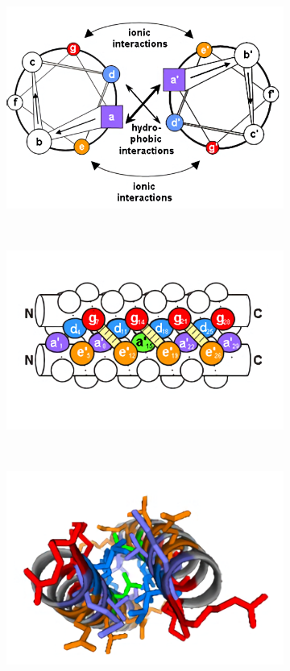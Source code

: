 \documentclass[12pt,a4paper,titlepage,openany]{report}
\begin{document}
\begin{figure}[h]
	\centering
	\begin{subfigure}{0.48\linewidth}
		\includegraphics[width=\linewidth]{coiled_coil_structure_a}
		\caption{}
		\label{subfig:Structure of coiled coils a}
	\end{subfigure}
	~
	\begin{subfigure}{0.48\linewidth}
		\includegraphics[width=\linewidth]{coiled_coil_structure_b}
		\caption{}
		\label{subfig:Structure of coiled coils b}
	\end{subfigure}
	~
	\begin{subfigure}{0.48\linewidth}
		\includegraphics[width=\linewidth]{coiled_coil_structure_c}

\end{subfigure}
\end{figure}
\end{document}
